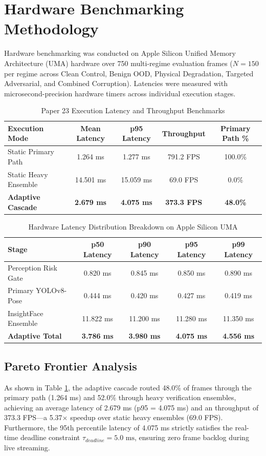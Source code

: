 \documentclass[conference]{IEEEtran}
\begin{document}
\section{Hardware Benchmarking Methodology}
Hardware benchmarking was conducted on Apple Silicon Unified Memory Architecture (UMA) hardware over 750 multi-regime evaluation frames ($N=150$ per regime across Clean Control, Benign OOD, Physical Degradation, Targeted Adversarial, and Combined Corruption). Latencies were measured with microsecond-precision hardware timers across individual execution stages.

\begin{table}[htbp]
\caption{Paper 23 Execution Latency and Throughput Benchmarks}
\centering
\begin{tabular}{l c c c c}
\toprule
\textbf{Execution Mode} & \textbf{Mean Latency} & \textbf{p95 Latency} & \textbf{Throughput} & \textbf{Primary Path \%} \\
\midrule
Static Primary Path & 1.264 ms & 1.277 ms & 791.2 FPS & 100.0\% \\
Static Heavy Ensemble & 14.501 ms & 15.059 ms & 69.0 FPS & 0.0\% \\
\textbf{Adaptive Cascade} & \textbf{2.679 ms} & \textbf{4.075 ms} & \textbf{373.3 FPS} & \textbf{48.0\%} \\
\bottomrule
\end{tabular}
\label{tab:p23_results}
\end{table}

\begin{table}[htbp]
\caption{Hardware Latency Distribution Breakdown on Apple Silicon UMA}
\centering
\begin{tabular}{l c c c c}
\toprule
\textbf{Stage} & \textbf{p50 Latency} & \textbf{p90 Latency} & \textbf{p95 Latency} & \textbf{p99 Latency} \\
\midrule
Perception Risk Gate & 0.820 ms & 0.845 ms & 0.850 ms & 0.890 ms \\
Primary YOLOv8-Pose & 0.444 ms & 0.420 ms & 0.427 ms & 0.419 ms \\
InsightFace Ensemble & 11.822 ms & 11.200 ms & 11.280 ms & 11.350 ms \\
\textbf{Adaptive Total} & \textbf{3.786 ms} & \textbf{3.980 ms} & \textbf{4.075 ms} & \textbf{4.556 ms} \\
\bottomrule
\end{tabular}
\label{tab:latency_dist}
\end{table}

\subsection{Pareto Frontier Analysis}
As shown in Table \ref{tab:p23_results}, the adaptive cascade routed 48.0\% of frames through the primary path (1.264 ms) and 52.0\% through heavy verification ensembles, achieving an average latency of 2.679 ms (p95 = 4.075 ms) and an throughput of 373.3 FPS—a 5.37$\times$ speedup over static heavy ensembles (69.0 FPS). Furthermore, the 95th percentile latency of 4.075 ms strictly satisfies the real-time deadline constraint $\tau_{deadline} = 5.0\text{ ms}$, ensuring zero frame backlog during live streaming.
\end{document}

